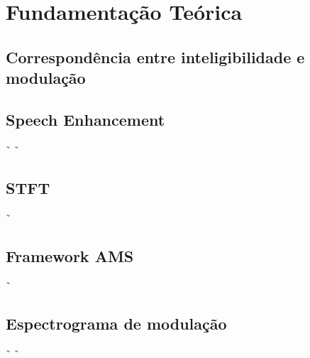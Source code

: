 \chapter{Fundamentação Teórica}


\section{Correspondência entre inteligibilidade e modulação}
\section{Speech Enhancement}
˜\newpage 
˜\newpage
\section{STFT}
\newpage 
˜\newpage 
\section{Framework AMS}
\newpage 
˜\newpage 
\section{Espectrograma de modulação}
\newpage 
˜\newpage 
˜\newpage